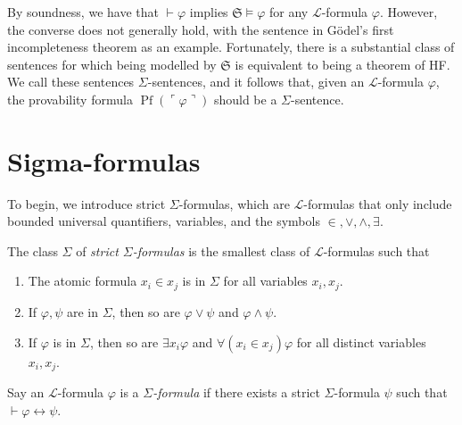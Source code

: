 By soundness, we have that $\vdash \varphi$ implies 
$\mathfrak{S} \vDash \varphi$ for any $\mathcal{L}$-formula $\varphi$.
However, the converse does not generally hold, with the sentence in Gödel's first incompleteness
theorem as an example.
Fortunately, there is a substantial class of sentences for which being modelled by $\mathfrak{S}$
is equivalent to being a theorem of HF.
We call these sentences $\Sigma$-sentences, and it follows that, given an $\mathcal{L}$-formula 
$\varphi$, the provability formula $\operatorname{Pf}(\ulcorner{\varphi}\urcorner)$ should be
a $\Sigma$-sentence.

\section{Sigma-formulas}

To begin, we introduce strict $\Sigma$-formulas, 
which are $\mathcal{L}$-formulas that only include bounded universal quantifiers, variables, 
and the symbols $\in, \lor, \land, \exists$.

\begin{definition}
\label{def:IsInSSigma}
\leanok
{}
The class $\Sigma$ of \textit{strict $\Sigma$-formulas} is the smallest class of 
$\mathcal{L}$-formulas such that
\begin{enumerate}
    \item The atomic formula $x_i \in x_j$ is in $\Sigma$ for all variables $x_i, x_j$.
    \item If $\varphi, \psi$ are in $\Sigma$, then so are 
        $\varphi \lor \psi$ and $\varphi \land \psi$.
    \item If $\varphi$ is in $\Sigma$, then so are $\exists x_i \varphi$ and 
        $\forall (x_i \in x_j) \varphi$ for all distinct variables $x_i, x_j$.
\end{enumerate}
\end{definition}

\begin{definition}
    \label{def:IsSigma}
    \leanok
    Say an $\mathcal{L}$-formula $\varphi$ is a \textit{$\Sigma$-formula} 
    if there exists a strict $\Sigma$-formula $\psi$ such that 
    $\vdash \varphi \leftrightarrow \psi$.
\end{definition}

